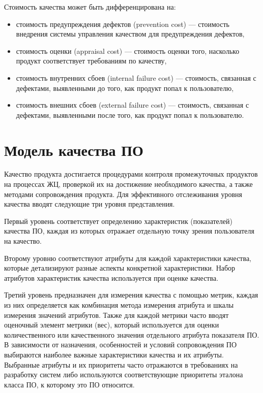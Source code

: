 \documentclass{../../text-style}
\begin{document}
Стоимость качества может быть дифференцирована на:

\begin{itemize}
    \item стоимость предупреждения дефектов (prevention cost) --- стоимость внедрения системы управления качеством для предупреждения дефектов,
    \item стоимость оценки (appraisal cost) --- стоимость оценки того, насколько продукт соответствует требованиям по качеству,
    \item стоимость внутренних сбоев (internal failure cost) --- стоимость, связанная с дефектами, выявленными до того, как продукт попал к пользователю,
    \item стоимость внешних сбоев (external failure cost) --- стоимость, связанная с дефектами, выявленными после того, как продукт попал к пользователю.
\end{itemize}

\section{Модель качества ПО}

Качество продукта достигается процедурами контроля промежуточных продуктов на процессах ЖЦ, проверкой их на достижение необходимого качества, а также методами сопровождения продукта. Для эффективного отслеживания уровня качества вводят следующие три уровня представления.

Первый уровень соответствует определению характеристик (показателей) качества ПО, каждая из которых отражает отдельную точку зрения пользователя на качество. 

Второму уровню соответствуют атрибуты для каждой характеристики качества, которые детализируют разные аспекты конкретной характеристики. Набор атрибутов характеристик качества используется при оценке качества.

Третий уровень предназначен для измерения качества с помощью метрик, каждая из них определяется как комбинация метода измерения атрибута и шкалы измерения значений атрибутов. Также для каждой метрики часто вводят оценочный элемент метрики (вес), который используется для оценки количественного или качественного значения отдельного атрибута показателя ПО. В зависимости от назначения, особенностей и условий сопровождения ПО выбираются наиболее важные характеристики качества и их атрибуты. Выбранные атрибуты и их приоритеты часто отражаются в требованиях на разработку систем либо используются соответствующие приоритеты эталона класса ПО, к которому это ПО относится.
\end{document}
